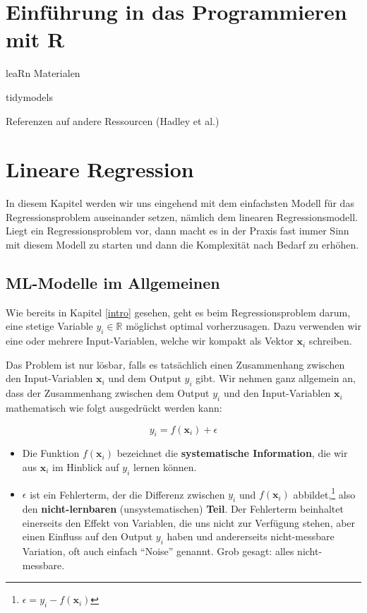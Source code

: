 \documentclass[
]{book}
\providecommand{\tightlist}{%
  \setlength{\itemsep}{0pt}\setlength{\parskip}{0pt}}
\begin{document}
\hypertarget{intro-R}{%
\chapter{Einführung in das Programmieren mit R}\label{intro-R}}

leaRn Materialen

tidymodels

Referenzen auf andere Ressourcen (Hadley et al.)

\hypertarget{lin-reg}{%
\chapter{Lineare Regression}\label{lin-reg}}

In diesem Kapitel werden wir uns eingehend mit dem einfachsten Modell für das Regressionsproblem auseinander setzen, nämlich dem linearen Regressionsmodell. Liegt ein Regressionsproblem vor, dann macht es in der Praxis fast immer Sinn mit diesem Modell zu starten und dann die Komplexität nach Bedarf zu erhöhen.

\hypertarget{ml-modelle-im-allgemeinen}{%
\section{ML-Modelle im Allgemeinen}\label{ml-modelle-im-allgemeinen}}

Wie bereits in Kapitel \ref{intro} gesehen, geht es beim Regressionsproblem darum, eine stetige Variable \(y_i \in \mathbb{R}\) möglichst optimal vorherzusagen. Dazu verwenden wir eine oder mehrere Input-Variablen, welche wir kompakt als Vektor \(\mathbf{x}_i\) schreiben.

Das Problem ist nur lösbar, falls es tatsächlich einen Zusammenhang zwischen den Input-Variablen \(\mathbf{x}_i\) und dem Output \(y_i\) gibt. Wir nehmen ganz allgemein an, dass der Zusammenhang zwischen dem Output \(y_i\) und den Input-Variablen \(\mathbf{x}_i\) mathematisch wie folgt ausgedrückt werden kann:

\[
y_i = f(\mathbf{x}_i) + \epsilon
\]

\begin{itemize}
\tightlist
\item
  Die Funktion \(f(\mathbf{x}_i)\) bezeichnet die \textbf{systematische Information}, die wir aus \(\mathbf{x}_i\) im Hinblick auf \(y_i\) lernen können.
\item
  \(\epsilon\) ist ein Fehlerterm, der die Differenz zwischen \(y_i\) und \(f(\mathbf{x}_i)\) abbildet,\footnote{\(\epsilon = y_i - f(\mathbf{x}_i)\)} also den \textbf{nicht-lernbaren} (unsystematischen) \textbf{Teil}. Der Fehlerterm beinhaltet einerseits den Effekt von Variablen, die uns nicht zur Verfügung stehen, aber einen Einfluss auf den Output \(y_i\) haben und andererseits nicht-messbare Variation, oft auch einfach ``Noise'' genannt. Grob gesagt: alles nicht-messbare.
\end{itemize}
\end{document}
